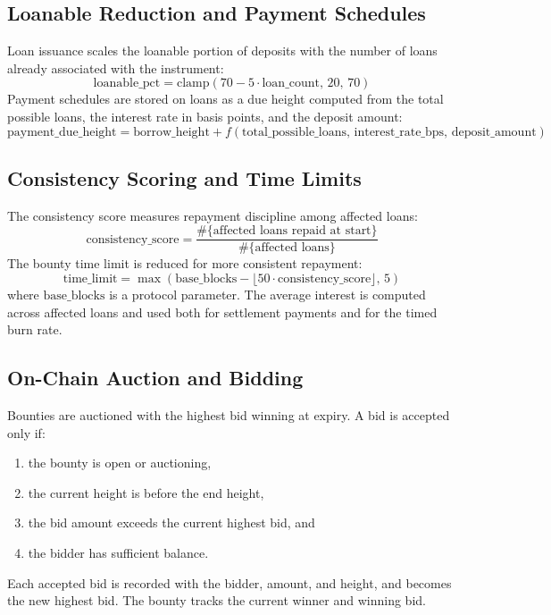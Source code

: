 \documentclass[11pt,a4paper]{article}
\begin{document}
\subsection{Loanable Reduction and Payment Schedules}
Loan issuance scales the loanable portion of deposits with the number of loans already associated with the instrument:
\begin{equation}
\text{loanable\_pct} = \mathrm{clamp}(70 - 5\cdot \text{loan\_count},\,20,\,70)
\end{equation}
Payment schedules are stored on loans as a due height computed from the total possible loans, the interest rate in basis points, and the deposit amount:
\begin{equation}
\text{payment\_due\_height} = \text{borrow\_height} + f(\text{total\_possible\_loans},\,\text{interest\_rate\_bps},\,\text{deposit\_amount})
\end{equation}

\subsection{Consistency Scoring and Time Limits}
The consistency score measures repayment discipline among affected loans:
\begin{equation}
\text{consistency\_score} = \frac{\#\{\text{affected loans repaid at start}\}}{\#\{\text{affected loans}\}}
\end{equation}
The bounty time limit is reduced for more consistent repayment:
\begin{equation}
\text{time\_limit} = \max(\text{base\_blocks} - \lfloor 50\cdot \text{consistency\_score}\rfloor,\,5)
\end{equation}
where $\text{base\_blocks}$ is a protocol parameter. The average interest is computed across affected loans and used both for settlement payments and for the timed burn rate.

\subsection{On-Chain Auction and Bidding}
Bounties are auctioned with the highest bid winning at expiry. A bid is accepted only if:
\begin{enumerate}
\item the bounty is open or auctioning,
\item the current height is before the end height,
\item the bid amount exceeds the current highest bid, and
\item the bidder has sufficient balance.
\end{enumerate}
Each accepted bid is recorded with the bidder, amount, and height, and becomes the new highest bid. The bounty tracks the current winner and winning bid.
\end{document}
